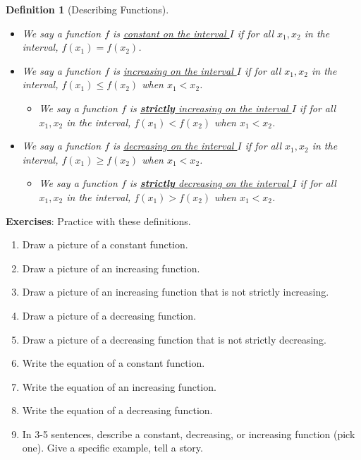 \documentclass{article}
\theoremstyle{plain}
\theoremstyle{box}
\newtheorem*{definition*}{Definition}
\begin{document}
\begin{definition*}[Describing Functions]\hfill
\begin{itemize}
\item We say a function $f$ is \underline{constant on the interval $I$} if for all $x_1, x_2$ in the interval, $f(x_1)=f(x_2)$.
\item We say a function $f$ is \underline{increasing on the interval $I$} if for all $x_1, x_2$ in the interval, $f(x_1) \leq f(x_2)$ when $x_1 < x_2$.
\begin{itemize}
\item We say a function $f$ is \underline{\textbf{strictly} increasing on the interval $I$} if for all $x_1, x_2$ in the interval, $f(x_1) < f(x_2)$ when $x_1 < x_2$.
\end{itemize}
\item We say a function $f$ is \underline{decreasing on the interval $I$} if for all $x_1, x_2$ in the interval, $f(x_1) \geq f(x_2)$ when $x_1 < x_2$.
\begin{itemize}
\item We say a function $f$ is \underline{\textbf{strictly} decreasing on the interval $I$} if for all $x_1, x_2$ in the interval, $f(x_1) > f(x_2)$ when $x_1 < x_2$.
\end{itemize}
\end{itemize}
\end{definition*}

\vfill

\textbf{Exercises}: Practice with these definitions.
\begin{enumerate}
\item Draw a picture of a constant function.
\item Draw a picture of an increasing function.
\item Draw a picture of an increasing function that is not strictly increasing.
\item Draw a picture of a decreasing function.
\item Draw a picture of a decreasing function that is not strictly decreasing.
\item Write the equation of a constant function.
\item Write the equation of an increasing function.
\item Write the equation of a decreasing function.
\item In 3-5 sentences, describe a constant, decreasing, or increasing function (pick one). Give a specific example, tell a story.
\end{enumerate}
\end{document}
